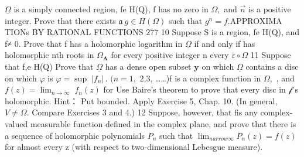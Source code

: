 $\underline{{\Omega}}$ is a simply connected region, fe H(Q), f has no zero in $\Omega,$ and $\scriptstyle{\vec{n}}$ is a positive integer. Prove that there exists ${\mathfrak{a}}\ g\in H(\Omega)$ such that $g^{n}=f.$APPROXIMA TIONs BY RATIONAL FUNCTIONS $277$ 10 Suppose S is a region, fe H(Q), and f≠ 0. Prove that f has a holomorphic logarithm in $\underline{{\Omega}}$ if and only if has holomorphic nth roots in $\Omega_{\mathbf{\Lambda}}$ for every positive integer n every $\scriptstyle{\varepsilon\circ\Omega}$ 11 Suppose that f,e H(Q) Prove that $\underline{{\Omega}}$ has a dense open subset ${\boldsymbol{y}}$ on which $\underline{{\Omega}}$ contains a disc on which $\scriptstyle{\varphi}$ is $\varphi=\operatorname*{sup}\;|f_{n}|\,.$ $(n=1,$ 2,3, ……)f is a complex function in $\Omega,$ , and $f(z)=\operatorname*{lim}_{n\to\infty}\;f_{n}(z)$ for Use Baire's theorem to prove that every disc in $\scriptstyle{\mathcal{f}}$ s holomorphic. Hint： Put bounded. Apply Exercise 5, Chap. 10. (In general, $V\neq\Omega.$ Compare Exercises 3 and 4.) 12 Suppose, however, that fis any complex-valued measurable function defined in the complex plane, and prove that there is a sequence of holomorphic polynomials ${\mathbf{}}P_{n}$ such that $\operatorname*{lim}_{n arrow\infty}P_{n}(z)=f(z)$ for almost every z (with respect to two-dimensional Lebesgue measure).
